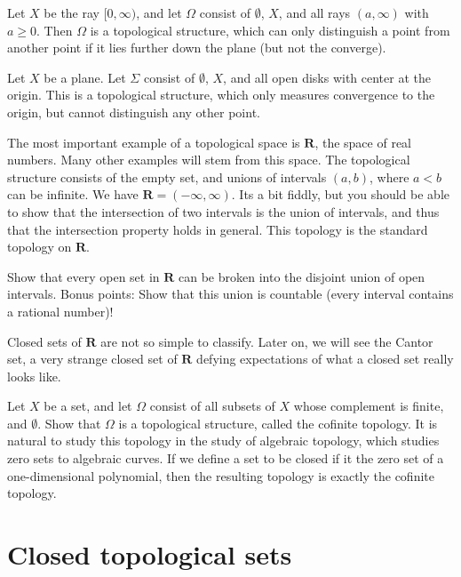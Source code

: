\begin{example}
    Let $X$ be the ray $[0,\infty)$, and let $\Omega$ consist of $\emptyset$, $X$, and all rays $(a,\infty)$ with $a \geq 0$. Then $\Omega$ is a topological structure, which can only distinguish a point from another point if it lies further down the plane (but not the converge).
\end{example}

\begin{example}
    Let $X$ be a plane. Let $\Sigma$ consist of $\emptyset$, $X$, and all open disks with center at the origin. This is a topological structure, which only measures convergence to the origin, but cannot distinguish any other point.
\end{example}

The most important example of a topological space is $\mathbf{R}$, the space of real numbers. Many other examples will stem from this space. The topological structure consists of the empty set, and unions of intervals $(a,b)$, where $a < b$ can be infinite. We have $\mathbf{R} = (-\infty, \infty)$. Its a bit fiddly, but you should be able to show that the intersection of two intervals is the union of intervals, and thus that the intersection property holds in general. This topology is the standard topology on $\mathbf{R}$.

\begin{example}
    Show that every open set in $\mathbf{R}$ can be broken into the disjoint union of open intervals. Bonus points: Show that this union is countable (every interval contains a rational number)!
\end{example}

Closed sets of $\mathbf{R}$ are not so simple to classify. Later on, we will see the Cantor set, a very strange closed set of $\mathbf{R}$ defying expectations of what a closed set really looks like.

\begin{example}
    Let $X$ be a set, and let $\Omega$ consist of all subsets of $X$ whose complement is finite, and $\emptyset$. Show that $\Omega$ is a topological structure, called the cofinite topology. It is natural to study this topology in the study of algebraic topology, which studies zero sets to algebraic curves. If we define a set to be closed if it the zero set of a one-dimensional polynomial, then the resulting topology is exactly the cofinite topology.
\end{example}

\section{Closed topological sets}

